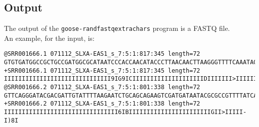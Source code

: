 \subsection*{Output}
The output of the \texttt{goose-randfastqextrachars} program is a FASTQ file.\\
An example, for the input, is:
\begin{lstlisting}
@SRR001666.1 071112_SLXA-EAS1_s_7:5:1:817:345 length=72
GTGTGATGGCCGCTGCCGATGGCGCATAATCCCACCAACATACCCTTAACAACTTAAGGGTTTTCAAATAGA
+SRR001666.1 071112_SLXA-EAS1_s_7:5:1:817:345 length=72
IIIIIIIIIIIIIIIIIIIIIIIIIIIIII9IG9ICIIIIIIIIIIIIIIIIIIIIDIIIIIII>IIIIII/
@SRR001666.2 071112_SLXA-EAS1_s_7:5:1:801:338 length=72
GTTCAGGGATACGACGATTGTATTTTAAGAATCTGCAGCAGAAGTCGATGATAATACGCGCCGTTTTATCAG
+SRR001666.2 071112_SLXA-EAS1_s_7:5:1:801:338 length=72
IIIIIIIIIIIIIIIIIIIIIIIIIIIIIIII6IBIIIIIIIIIIIIIIIIIIIIIIIGII>IIIII-I)8I
\end{lstlisting}
